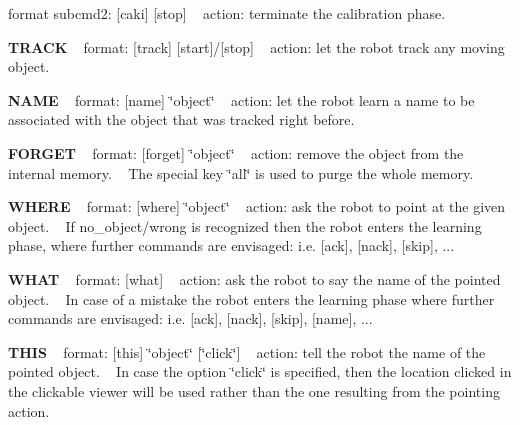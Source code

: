 format subcmd2\+: \mbox{[}caki\mbox{]} \mbox{[}stop\mbox{]} ~\newline
action\+: terminate the calibration phase.

{\bfseries{T\+R\+A\+CK}} ~\newline
format\+: \mbox{[}track\mbox{]} \mbox{[}start\mbox{]}/\mbox{[}stop\mbox{]} ~\newline
action\+: let the robot track any moving object.

{\bfseries{N\+A\+ME}} ~\newline
format\+: \mbox{[}name\mbox{]} \char`\"{}object\char`\"{} ~\newline
action\+: let the robot learn a name to be associated with the object that was tracked right before.

{\bfseries{F\+O\+R\+G\+ET}} ~\newline
format\+: \mbox{[}forget\mbox{]} \char`\"{}object\char`\"{} ~\newline
action\+: remove the object from the internal memory. ~\newline
The special key \char`\"{}all\char`\"{} is used to purge the whole memory.

{\bfseries{W\+H\+E\+RE}} ~\newline
format\+: \mbox{[}where\mbox{]} \char`\"{}object\char`\"{} ~\newline
action\+: ask the robot to point at the given object. ~\newline
If no\+\_\+object/wrong is recognized then the robot enters the learning phase, where further commands are envisaged\+: i.\+e. \mbox{[}ack\mbox{]}, \mbox{[}nack\mbox{]}, \mbox{[}skip\mbox{]}, ...

{\bfseries{W\+H\+AT}} ~\newline
format\+: \mbox{[}what\mbox{]} ~\newline
action\+: ask the robot to say the name of the pointed object. ~\newline
In case of a mistake the robot enters the learning phase where further commands are envisaged\+: i.\+e. \mbox{[}ack\mbox{]}, \mbox{[}nack\mbox{]}, \mbox{[}skip\mbox{]}, \mbox{[}name\mbox{]}, ...

{\bfseries{T\+H\+IS}} ~\newline
format\+: \mbox{[}this\mbox{]} \char`\"{}object\char`\"{} \mbox{[}\char`\"{}click\char`\"{}\mbox{]} ~\newline
action\+: tell the robot the name of the pointed object. ~\newline
In case the option \char`\"{}click\char`\"{} is specified, then the location clicked in the clickable viewer will be used rather than the one resulting from the pointing action.

